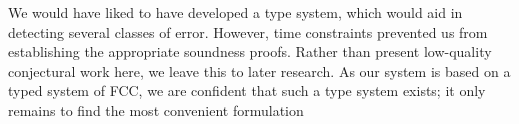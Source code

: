\documentclass[11pt]{article}
\begin{document}
We would have liked to have developed a type system, which would aid in detecting several classes of error.
However, time constraints prevented us from establishing the appropriate soundness proofs.
Rather than present low-quality conjectural work here, we leave this to later research.
As our system is based on a typed system of FCC\cite{MFDC}, we are confident that such a type system exists; it only remains to find the most convenient formulation

%
%
%
%
\end{document}
